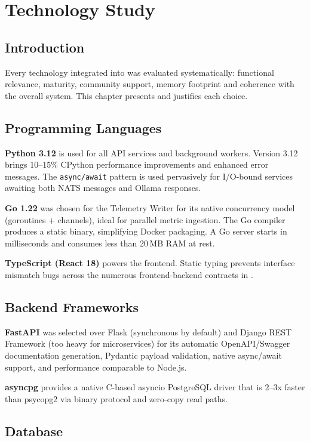\chapter{Technology Study}

\section*{Introduction}

Every technology integrated into \caimp{} was evaluated systematically:
functional relevance, maturity, community support, memory footprint and
coherence with the overall system. This chapter presents and justifies each choice.

\section{Programming Languages}

\textbf{Python 3.12} is used for all API services and background workers.
Version 3.12 brings 10--15\% CPython performance improvements and enhanced
error messages. The \texttt{async/await} pattern is used pervasively for
I/O-bound services awaiting both NATS messages and Ollama responses.

\textbf{Go 1.22} was chosen for the Telemetry Writer for its native concurrency
model (goroutines + channels), ideal for parallel metric ingestion. The Go
compiler produces a static binary, simplifying Docker packaging. A Go server
starts in milliseconds and consumes less than 20\,MB RAM at rest.

\textbf{TypeScript (React 18)} powers the frontend. Static typing prevents
interface mismatch bugs across the numerous frontend-backend contracts in \caimp{}.

\section{Backend Frameworks}

\textbf{FastAPI} \cite{fastapi_docs} was selected over Flask (synchronous by
default) and Django REST Framework (too heavy for microservices) for its automatic
OpenAPI/Swagger documentation generation, Pydantic payload validation, native
async/await support, and performance comparable to Node.js.

\textbf{asyncpg} provides a native C-based asyncio PostgreSQL driver that is
2--3x faster than psycopg2 via binary protocol and zero-copy read paths.

\section{Database}

